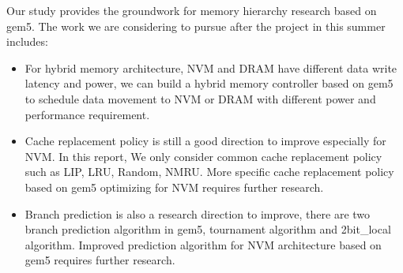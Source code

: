 
Our study provides the groundwork for memory hierarchy research based on gem5. The work we are considering to pursue after the project in this summer includes:


\begin{itemize}
\item For hybrid memory architecture, NVM and DRAM have different data write latency and power, we can build a hybrid memory controller based on gem5 to schedule data movement to NVM or DRAM with different power and performance requirement.    
\item Cache replacement policy is still a good direction to improve especially for NVM. In this report, We only consider common cache replacement policy such as LIP, LRU, Random, NMRU. More specific cache replacement policy based on gem5 optimizing for NVM requires further research. 
\item Branch prediction is also a research direction to improve, there are two branch prediction algorithm in gem5, tournament algorithm and 2bit\_local algorithm. Improved prediction algorithm for NVM architecture based on gem5 requires further research.  

\end{itemize}